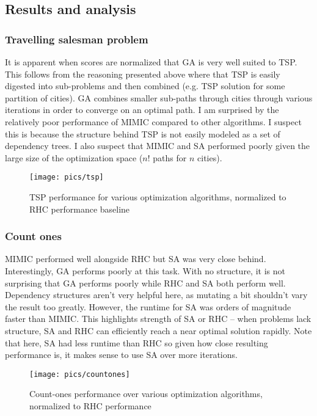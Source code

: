 \documentclass[12pt]{article}
\begin{document}
\subsection{Results and analysis}

\subsubsection{Travelling salesman problem}

It is apparent when scores are normalized that GA is very well suited to TSP. This follows from the reasoning presented above where that TSP is easily digested into sub-problems and then combined (e.g. TSP solution for some partition of cities). GA combines smaller sub-paths through cities through various iterations in order to converge on an optimal path. I am surprised by the relatively poor performance of MIMIC compared to other algorithms. I suspect this is because the structure behind TSP is not easily modeled as a set of dependency trees. I also suspect that MIMIC and SA performed poorly given the large size of the optimization space ($n!$ paths for $n$ cities).

\begin{figure}[h!]
    \texttt{[image: pics/tsp]}
    \caption{TSP performance for various optimization algorithms, normalized to RHC performance baseline}
\end{figure}

\subsubsection{Count ones}

MIMIC performed well alongside RHC but SA was very close behind. Interestingly, GA performs poorly at this task. With no structure, it is not surprising that GA performs poorly while RHC and SA both perform well. Dependency structures aren't very helpful here, as mutating a bit shouldn't vary the result too greatly. However, the runtime for SA was orders of magnitude faster than MIMIC. This highlights strength of SA or RHC – when problems lack structure, SA and RHC can efficiently reach a near optimal solution rapidly. Note that here, SA had less runtime than RHC so given how close resulting performance is, it makes sense to use SA over more iterations.

\begin{figure}[h!]
    \texttt{[image: pics/countones]}
    \caption{Count-ones performance over various optimization algorithms, normalized to RHC performance}
\end{figure}
\end{document}
